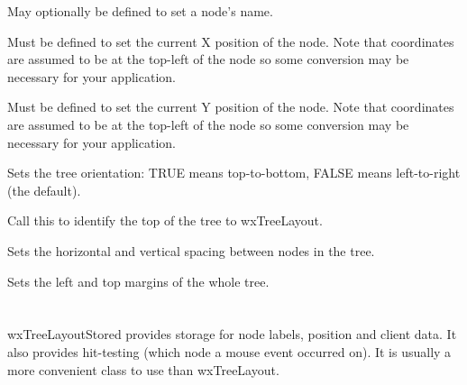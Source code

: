 

May optionally be defined to set a node's name.



Must be defined to set the current X position of the node. Note that
coordinates are assumed to be at the top-left of the node so some conversion
may be necessary for your application.



Must be defined to set the current Y position of the node. Note that
coordinates are assumed to be at the top-left of the node so some conversion
may be necessary for your application.



Sets the tree orientation: TRUE means top-to-bottom, FALSE means left-to-right (the default).

\label{wxtreelayoutsettopnode}


Call this to identify the top of the tree to wxTreeLayout.



Sets the horizontal and vertical spacing between nodes in the tree.

\label{wxtreelayoutsetmargins}


Sets the left and top margins of the whole tree.

\section{}\label{wxtreelayoutstored}

wxTreeLayoutStored provides storage for node labels, position and client data. It also provides hit-testing
(which node a mouse event occurred on). It is usually a more convenient class to use than wxTreeLayout.

